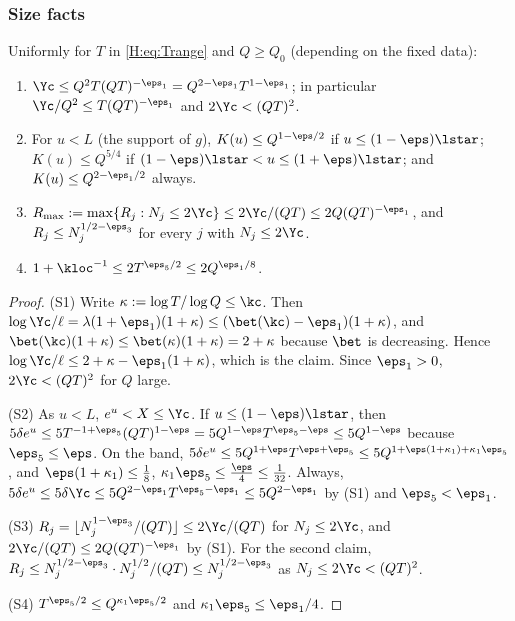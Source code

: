 \subsubsection*{Size facts}
\begin{lemma}\label{H:lem:sizes}
Uniformly for $T$ in \eqref{H:eq:Trange} and $Q\ge Q_0$ (depending on the fixed data):
\begin{enumerate}
\item[(S1)] $\Yc\le Q^2T(QT)^{-\eps_1}=Q^{2-\eps_1}T^{1-\eps_1}$; in particular $\Yc/Q^2\le T(QT)^{-\eps_1}$ and $2\Yc<(QT)^2$.
\item[(S2)] For $u<L$ (the support of $g$), $K(u)\le Q^{1-\eps/2}$ if $u\le(1-\eps)\lstar$; $K(u)\le Q^{5/4}$ if $(1-\eps)\lstar<u\le(1+\eps)\lstar$; and $K(u)\le Q^{2-\eps_1/2}$ always.
\item[(S3)] $R_{\max}:=\max\{R_j:N_j\le2\Yc\}\le2\Yc/(QT)\le2Q(QT)^{-\eps_1}$, and $R_j\le N_j^{1/2-\eps_3}$ for every $j$ with $N_j\le2\Yc$.
\item[(S4)] $1+\kloc^{-1}\le2T^{\eps_5/2}\le2Q^{\eps_1/8}$.
\end{enumerate}
\end{lemma}

\begin{proof}
(S1) Write $\kappa:=\log T/\log Q\le\kc$. Then $\log\Yc/\ell=\lambda(1+\eps_1)(1+\kappa)\le(\bet(\kc)-\eps_1)(1+\kappa)$, and $\bet(\kc)(1+\kappa)\le\bet(\kappa)(1+\kappa)=2+\kappa$ because $\bet$ is decreasing. Hence $\log\Yc/\ell\le2+\kappa-\eps_1(1+\kappa)$, which is the claim. Since $\eps_1>0$, $2\Yc<(QT)^2$ for $Q$ large.

(S2) As $u<L$, $e^u<X\le\Yc$. If $u\le(1-\eps)\lstar$, then $5\delta e^u\le5T^{-1+\eps_5}(QT)^{1-\eps}=5Q^{1-\eps}T^{\eps_5-\eps}\le5Q^{1-\eps}$ because $\eps_5\le\eps$. On the band, $5\delta e^u\le5Q^{1+\eps}T^{\eps+\eps_5}\le5Q^{1+\eps(1+\kappa_1)+\kappa_1\eps_5}$, and $\eps(1+\kappa_1)\le\frac18$, $\kappa_1\eps_5\le\frac\eps4\le\frac1{32}$. Always, $5\delta e^u\le5\delta\Yc\le5Q^{2-\eps_1}T^{\eps_5-\eps_1}\le5Q^{2-\eps_1}$ by (S1) and $\eps_5<\eps_1$.

(S3) $R_j=\lfloor N_j^{1-\eps_3}/(QT)\rfloor\le2\Yc/(QT)$ for $N_j\le2\Yc$, and $2\Yc/(QT)\le2Q(QT)^{-\eps_1}$ by (S1). For the second claim, $R_j\le N_j^{1/2-\eps_3}\cdot N_j^{1/2}/(QT)\le N_j^{1/2-\eps_3}$ as $N_j\le2\Yc<(QT)^2$.

(S4) $T^{\eps_5/2}\le Q^{\kappa_1\eps_5/2}$ and $\kappa_1\eps_5\le\eps_1/4$.
\end{proof}

